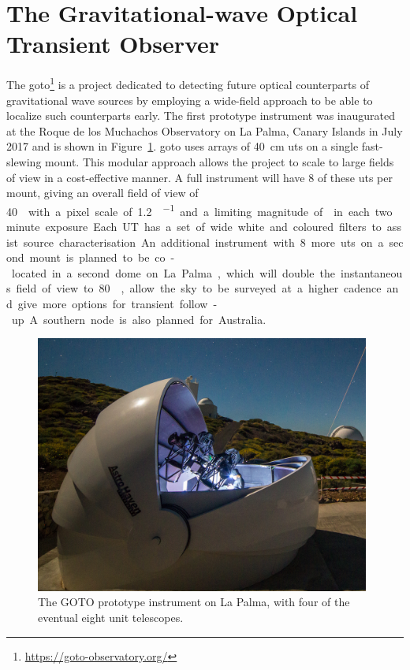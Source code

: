
\newpage
\section{The Gravitational-wave Optical Transient Observer}
\label{sec:goto}
\begin{colsection}


\begin{colsection}

The \gls{goto}\footnote{\url{https://goto-observatory.org/}} is a project dedicated to detecting future optical counterparts of gravitational wave sources by employing a wide-field approach to be able to localize such counterparts early. The first prototype instrument was inaugurated at the Roque de los Muchachos Observatory on La Palma, Canary Islands in July 2017 and is shown in Figure~\ref{fig:goto_photo}. \gls{goto} uses arrays of \SI{40}{\cm} \glspl{ut} on a single fast-slewing mount. This modular approach allows the project to scale to large fields of view in a cost-effective manner. A full instrument will have 8 of these \glspl{ut} per mount, giving an overall field of view of \SI{40}{\square\deg} with a pixel scale of \SI[per-mode=symbol]{1.2}{\arcsec\per\pixel} and a limiting magnitude of  in each two minute exposure. Each UT has a set of wide white and coloured filters to assist source characterisation.  An additional instrument with 8 more \glspl{ut} on a second mount is planned to be co-located in a second dome on La Palma, which will double the instantaneous field of view to \SI{80}{\square\deg}, allow the sky to be surveyed at a higher cadence and give more options for transient follow-up. A southern node is also planned for Australia.

\begin{figure}[htb]
\begin{center}
\includegraphics[width=11cm]{images/goto_photo.jpg}
\end{center}
\caption[The GOTO prototype instrument]{The GOTO prototype instrument on La Palma, with four of the eventual eight unit telescopes.}
\label{fig:goto_photo}
\end{figure}


\end{colsection}
\end{colsection}
